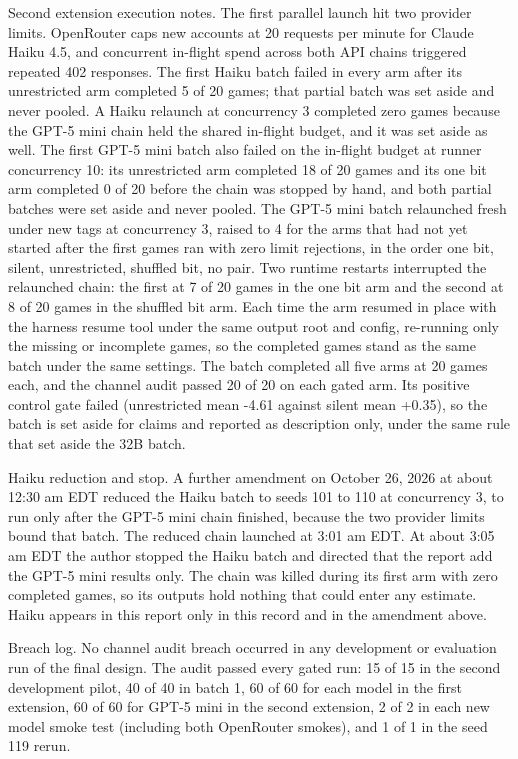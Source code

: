 \documentclass[11pt]{article}
\begin{document}
Second extension execution notes. The first parallel launch hit two
provider limits. OpenRouter caps new accounts at 20 requests per minute
for Claude Haiku 4.5, and concurrent in-flight spend across both API
chains triggered repeated 402 responses. The first Haiku batch failed in
every arm after its unrestricted arm completed 5 of 20 games; that
partial batch was set aside and never pooled. A Haiku relaunch at
concurrency 3 completed zero games because the GPT-5 mini chain held the
shared in-flight budget, and it was set aside as well. The first GPT-5
mini batch also failed on the in-flight budget at runner concurrency 10:
its unrestricted arm completed 18 of 20 games and its one bit arm
completed 0 of 20 before the chain was stopped by hand, and both partial
batches were set aside and never pooled. The GPT-5 mini batch relaunched
fresh under new tags at concurrency 3, raised to 4 for the arms that had
not yet started after the first games ran with zero limit rejections, in
the order one bit, silent, unrestricted, shuffled bit, no pair. Two
runtime restarts interrupted the relaunched chain: the first at 7 of 20
games in the one bit arm and the second at 8 of 20 games in the shuffled
bit arm. Each time the arm resumed in place with the harness resume tool
under the same output root and config, re-running only the missing or
incomplete games, so the completed games stand as the same batch under
the same settings. The batch completed all five arms at 20 games each,
and the channel audit passed 20 of 20 on each gated arm. Its positive
control gate failed (unrestricted mean -4.61 against silent mean +0.35),
so the batch is set aside for claims and reported as description only,
under the same rule that set aside the 32B batch.

Haiku reduction and stop. A further amendment on October 26, 2026 at
about 12:30 am EDT reduced the Haiku batch to seeds 101 to 110 at
concurrency 3, to run only after the GPT-5 mini chain finished, because
the two provider limits bound that batch. The reduced chain launched at
3:01 am EDT. At about 3:05 am EDT the author stopped the Haiku batch and
directed that the report add the GPT-5 mini results only. The chain was
killed during its first arm with zero completed games, so its outputs
hold nothing that could enter any estimate. Haiku appears in this report
only in this record and in the amendment above.

Breach log. No channel audit breach occurred in any development or
evaluation run of the final design. The audit passed every gated run: 15
of 15 in the second development pilot, 40 of 40 in batch 1, 60 of 60 for
each model in the first extension, 60 of 60 for GPT-5 mini in the second
extension, 2 of 2 in each new model smoke test (including both
OpenRouter smokes), and 1 of 1 in the seed 119 rerun.
\end{document}

